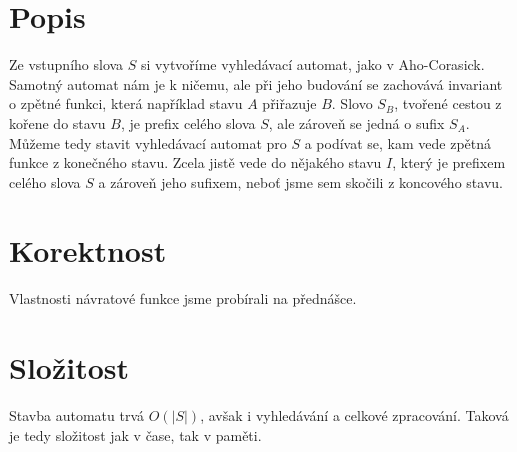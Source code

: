 \documentclass[a4paper]{article}
\begin{document}
\renewcommand{\headrulewidth}{0pt} %
\thispagestyle{fancy} %
{}

\section*{Popis}
Ze vstupního slova $S$ si vytvoříme vyhledávací automat, jako v Aho-Corasick. Samotný automat nám je k ničemu, ale při jeho budování se zachovává invariant o zpětné funkci, která například stavu $A$ přiřazuje $B$. Slovo $S_B$, tvořené cestou z kořene do stavu $B$, je prefix celého slova $S$, ale zároveň se jedná o sufix $S_A$. Můžeme tedy stavit vyhledávací automat pro $S$ a podívat se, kam vede zpětná funkce z konečného stavu. Zcela jistě vede do nějakého stavu $I$, který je prefixem celého slova $S$ a zároveň jeho sufixem, neboť jsme sem skočili z koncového stavu.

\section*{Korektnost}
Vlastnosti návratové funkce jsme probírali na přednášce.

\section*{Složitost}
Stavba automatu trvá $O(|S|)$, avšak i vyhledávání a celkové zpracování. Taková je tedy složitost jak v čase, tak v paměti.
\end{document}
